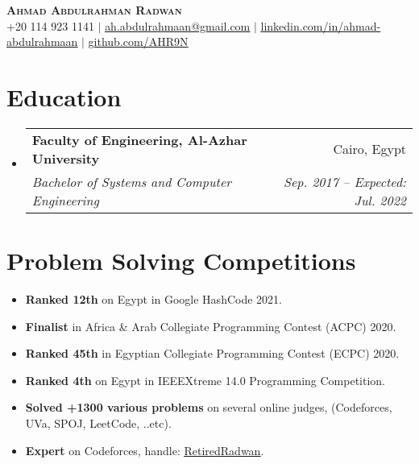 \documentclass[letterpaper,11pt]{article}
\makeatletter
\newcommand{\resumeItem}[1]{
  \item\small{
    {#1 \vspace{-2pt}}
  }
}
\newcommand{\resumeSubheading}[4]{
  \vspace{-2pt}\item
    \begin{tabular*}{0.97\textwidth}[t]{l@{\extracolsep{\fill}}r}
      \textbf{#1} & #2 \\
      \textit{\small#3} & \textit{\small #4} \\
    \end{tabular*}\vspace{-7pt}
}
\newcommand{\resumeSubHeadingListStart}{\begin{itemize}[leftmargin=0.15in, label={}]}
\newcommand{\resumeSubHeadingListEnd}{\end{itemize}}
\newcommand{\resumeItemListStart}{\begin{itemize}}
\newcommand{\resumeItemListEnd}{\end{itemize}\vspace{-5pt}}
\makeatother
\begin{document}

\begin{center}
    \textbf{\Huge \scshape Ahmad Abdulrahman Radwan} \\ \vspace{1pt}
    \small +20 114 923 1141 $|$ \href{mailto:ah.abdulrahmaan@gmail.com}{\underline{ah.abdulrahmaan@gmail.com}} $|$ 
    \href{https://linkedin.com/in/ahmad-abdulrahmaan}{\underline{linkedin.com/in/ahmad-abdulrahmaan}} $|$
    \href{https://github.com/AHR9N}{\underline{github.com/AHR9N}}
\end{center}

\section{Education}
  \resumeSubHeadingListStart
    \resumeSubheading
      {Faculty of Engineering, Al-Azhar University}{Cairo, Egypt}
      {Bachelor of Systems and Computer Engineering}{Sep. 2017 -- Expected: Jul. 2022}
  \resumeSubHeadingListEnd

\section{Problem Solving Competitions}
    \resumeItemListStart
        \resumeItem{\textbf{Ranked 12th} on Egypt in Google HashCode 2021.}
        \resumeItem{\textbf{Finalist} in Africa \& Arab Collegiate Programming Contest (ACPC) 2020.}
        \resumeItem{\textbf{Ranked 45th} in Egyptian Collegiate Programming Contest (ECPC) 2020.}
        \resumeItem{\textbf{Ranked 4th} on Egypt in IEEEXtreme 14.0 Programming Competition.}
        \resumeItem{\textbf{Solved +1300 various problems} on several online judges, (Codeforces, UVa, SPOJ, LeetCode, ..etc).}
        \resumeItem{\textbf{Expert} on Codeforces, handle: \href{https://codeforces.com/profile/RetiredRadwan}{\underline{RetiredRadwan}}.}
      \resumeItemListEnd
\end{document}

